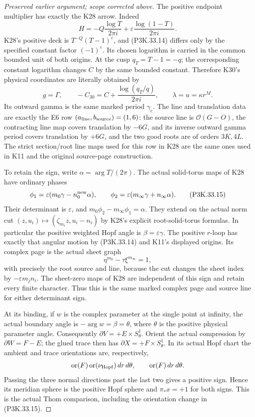 \begin{proof}[Preserved earlier argument; scope corrected above]
The positive endpoint multiplier has exactly the K28 arrow. Indeed
\[
 H=-Q\frac{\log T}{2\pi i}
       +\varepsilon\frac{\log(1-T)}{2\pi i}.
                                                               \tag{P3K.33.14}
\]
K28's positive deck is
\(T^{-Q}(T-1)^{\varepsilon}\), and (P3K.33.14) differs only by
the specified constant factor \((-1)^{\varepsilon}\). Its chosen
logarithm is carried in the common bounded unit of both origins.
At the cusp \(q_T=T-1=-q\); the corresponding constant logarithm
changes \(C\) by the same bounded constant. Therefore K30's
physical coordinates are literally obtained by
\[
 g=\Gamma,\qquad -C_{30}=C+\frac{\log(q_T/q)}{2\pi i},
 \qquad \lambda=u=\kappa r^M.
\]
Its outward gamma is the same marked period \(\gamma_c\).
The line and translation data are exactly the E6 row
\((a_{\rm line},b_{\rm source})=(1,6)\): the source line is
\(\mathcal O(G-O)\), the contracting line map covers
translation by \(-6G\), and its inverse outward gamma period
covers translation by \(+6G\),
and the two good roots are of orders \(3K,4L\). The strict
section/root line maps used for this row in K28 are the same
ones used in K11 and the original source-page construction.

To retain the sign, write \(\alpha=\arg T/(2\pi)\). The actual
solid-torus maps of K28 have ordinary phases
\[
 \phi_1=\varepsilon(m_0\gamma-n_0^{\rm new}\alpha),\qquad
 \phi_2=\varepsilon(m_\infty\gamma+n_\infty\alpha).
                                                               \tag{P3K.33.15}
\]
Their determinant is \(\varepsilon\), and
\(m_0\phi_2-m_\infty\phi_1=\alpha\). They extend on the
actual norm cut \((z,u_i)\mapsto(\zeta_{m_i}z,u_i-n_i)\)
by K28's explicit root-solid-torus formulas. In particular the
positive weighted Hopf angle is \(\beta=\varepsilon\gamma\).
The positive \(r\)-loop has exactly that angular motion by
(P3K.33.14) and K11's displayed origins. Its complex page is the
actual sheet graph
\[
                 \eta^{m_0}-\tau\xi^{m_\infty}=1,
\]
with precisely the root source and line, because the cut changes
the sheet index by \(-\varepsilon m_jn_i\). The sheet-zero
maps of K28 are independent of this sign and retain every
finite character. Thus this is the same marked complex page
and source line for either determinant sign.

At its binding, if \(w\) is the complex parameter at the single
point at infinity, the actual boundary angle is
\(-\arg w=\beta=\theta\), where \(\theta\) is the positive
physical parameter angle. Consequently
\(\partial V=+E\times S^1_\theta\). Orient the actual compression
by \(\partial W=F-E\); the glued trace then has
\(\partial X=+F\times S^1_\theta\). In its actual Hopf chart
the ambient and trace orientations are, respectively,
\[
 \operatorname{or}(F)\operatorname{or}(\nu_{\rm Hopf})\,dr\,d\theta,
 \qquad \operatorname{or}(F)\,dr\,d\theta.
\]
Passing the three normal directions past the last two gives a
positive sign. Hence its meridian sphere is the positive Hopf
sphere and \(\pi_*x=+1\) for both signs. This is the actual
Thom comparison, including the orientation change in (P3K.33.15).


\end{proof}
